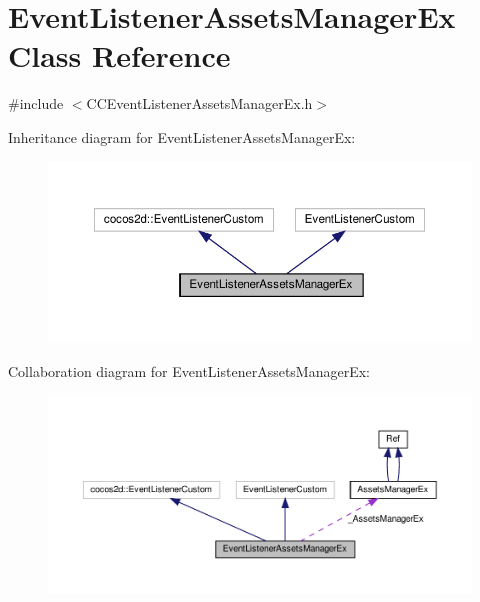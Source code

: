 \hypertarget{classEventListenerAssetsManagerEx}{}\section{Event\+Listener\+Assets\+Manager\+Ex Class Reference}
\label{classEventListenerAssetsManagerEx}


{\ttfamily \#include $<$C\+C\+Event\+Listener\+Assets\+Manager\+Ex.\+h$>$}



Inheritance diagram for Event\+Listener\+Assets\+Manager\+Ex\+:
\nopagebreak
\begin{figure}[H]
\begin{center}
\leavevmode
\includegraphics[width=350pt]{classEventListenerAssetsManagerEx__inherit__graph}
\end{center}
\end{figure}


Collaboration diagram for Event\+Listener\+Assets\+Manager\+Ex\+:
\nopagebreak
\begin{figure}[H]
\begin{center}
\leavevmode
\includegraphics[width=350pt]{classEventListenerAssetsManagerEx__coll__graph}
\end{center}
\end{figure}
